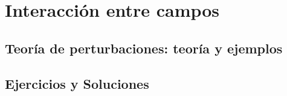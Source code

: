 \chapter{Interacción entre campos}

\section{Teoría de perturbaciones: teoría y ejemplos}

\newpage

\section{Ejercicios y Soluciones}



